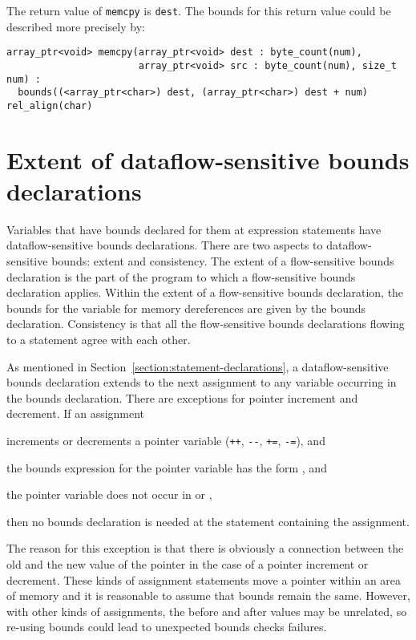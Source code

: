 The return value of \texttt{memcpy} is \texttt{dest}. The bounds for
this return value could be described more precisely by:

\begin{verbatim}
array_ptr<void> memcpy(array_ptr<void> dest : byte_count(num),
                       array_ptr<void> src : byte_count(num), size_t num) :
  bounds((<array_ptr<char>) dest, (array_ptr<char>) dest + num) rel_align(char)
\end{verbatim}

\section{Extent of dataflow-sensitive bounds declarations}
\label{section:extent-of-declarations}

Variables that have bounds declared for them at expression statements
have dataflow-sensitive bounds declarations. There are two aspects to
dataflow-sensitive bounds: extent and consistency. The extent of a
flow-sensitive bounds declaration is the part of the program to which 
a flow-sensitive bounds
declaration applies. Within the extent of a flow-sensitive 
bounds declaration, the
bounds for the variable for memory dereferences are given by the bounds
declaration. Consistency is that all the flow-sensitive bounds 
declarations flowing to a statement agree with each other.

As mentioned in Section~\ref{section:statement-declarations},
a dataflow-sensitive bounds declaration
extends to the next assignment to any variable occurring in the bounds
declaration. There are exceptions for pointer increment and decrement.
If an assignment

\begin{compactitem}
\item
  increments or decrements a pointer variable (\texttt{++},
  \texttt{-\/-}, \texttt{+=}, \texttt{-=}), and
\item
  the bounds expression for the pointer variable has the form
  , and
\item
  the pointer variable does not occur in  or ,
\end{compactitem}

then no bounds declaration is needed at the statement containing the
assignment.

The reason for this exception is that there is obviously a connection
between the old and the new value of the pointer in the case of a
pointer increment or decrement. These kinds of assignment statements
move a pointer within an area of memory and it is reasonable to assume
that bounds remain the same. However, with other kinds of assignments,
the before and after values may be unrelated, so re-using bounds could
lead to unexpected bounds checks failures.

